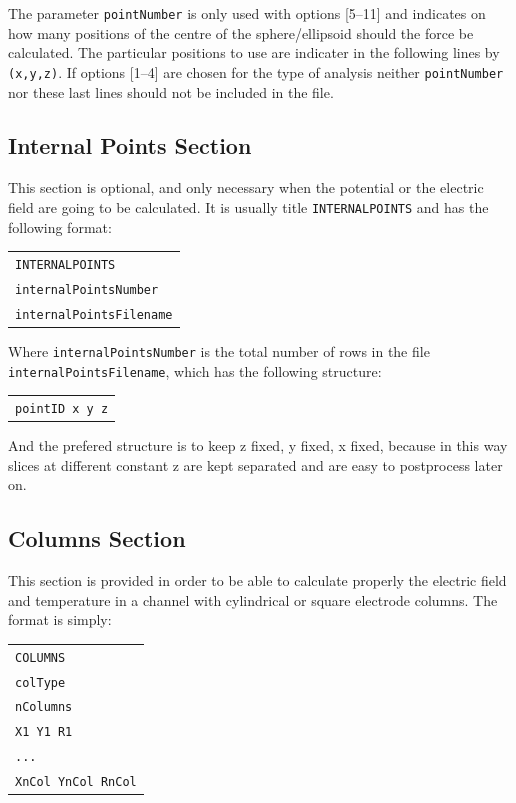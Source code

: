 \documentclass[12pt]{article}
\begin{document}
The parameter \verb+pointNumber+ is only used with options [5--11] and indicates on how many positions of the centre of the sphere/ellipsoid should the force be calculated. The particular positions to use are indicater in the following lines by \verb+(x,y,z)+. If options [1--4] are chosen for the type of analysis neither \verb+pointNumber+ nor these last lines should not be included in the file. 

\subsection{Internal Points Section}
This section is optional, and only necessary when the potential or the electric field are going to be calculated. It is usually title \verb+INTERNALPOINTS+ and has the following format:

\begin{tabular}{l}
\texttt{INTERNALPOINTS}\\
\texttt{internalPointsNumber}\\
\texttt{internalPointsFilename}
\end{tabular}

Where \verb+internalPointsNumber+ is the total number of rows in the file \verb+internalPointsFilename+, which has the following structure:

\begin{tabular}{l}
\texttt{pointID x y z}
\end{tabular}

And the prefered structure is to keep z fixed, y fixed, x fixed, because in this way slices at different constant z are kept separated and are easy to postprocess later on.

\subsection{Columns Section}
This section is provided in order to be able to calculate properly the electric field and temperature in a channel with cylindrical or square electrode columns. The format is simply:

\begin{tabular}{l}
\texttt{COLUMNS}\\
\texttt{colType}\\
\texttt{nColumns}\\
\texttt{X1 Y1 R1}\\
\texttt{...}\\
\texttt{XnCol YnCol RnCol}
\end{tabular}
\end{document}
